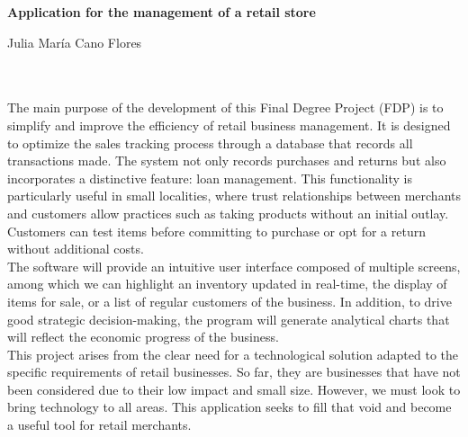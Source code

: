 \cleardoublepage




\begin{center}
{\large\bfseries Application for the management of a retail store}\\
\end{center}
\begin{center}
Julia María Cano Flores\\
\end{center}

\vspace{0.7cm}
\\

\vspace{0.7cm}
\\


The main purpose of the development of this Final Degree Project (FDP) is to simplify and improve the efficiency of retail business management. It is designed to optimize the sales tracking process through a database that records all transactions made. The system not only records purchases and returns but also incorporates a distinctive feature: loan management. This functionality is particularly useful in small localities, where trust relationships between merchants and customers allow practices such as taking products without an initial outlay. Customers can test items before committing to purchase or opt for a return without additional costs.\\

The software will provide an intuitive user interface composed of multiple screens, among which we can highlight an inventory updated in real-time, the display of items for sale, or a list of regular customers of the business. In addition, to drive good strategic decision-making, the program will generate analytical charts that will reflect the economic progress of the business.\\

This project arises from the clear need for a technological solution adapted to the specific requirements of retail businesses. So far, they are businesses that have not been considered due to their low impact and small size. However, we must look to bring technology to all areas. This application seeks to fill that void and become a useful tool for retail merchants.



\chapter*{}

